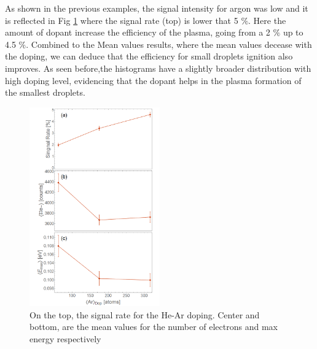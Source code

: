 
As shown in the previous examples, the signal intensity for argon was low and it is reflected in Fig \ref{fig:He-Armean} where the signal rate (top) is lower that 5 $\%$. Here the amount of dopant increase the efficiency of the plasma, going from a 2 $\%$ up to 4.5 $\%$. Combined to the Mean values results, where the mean values decease with the doping, we can deduce that the efficiency for small droplets ignition also improves. As seen before,the histograms have a slightly broader distribution with high doping level, evidencing that the dopant helps in the plasma formation of the smallest droplets.
 
\begin{figure}[h!]
\centering
\includegraphics[width=0.5\textwidth]{../Images/results/MIR_He_ArDop/Alltogether.png} 
\caption[MIR He-Ar doping, signal rate and mean values]{On the top, the signal rate for the He-Ar doping. Center and bottom, are the mean values for the number of electrons and max energy respectively}
\label{fig:He-Armean}
\end{figure}

